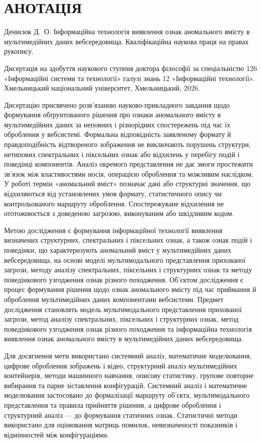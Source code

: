 \chapter*{АНОТАЦІЯ}
{}

Денисюк Д.~О. Інформаційна технологія виявлення ознак аномального вмісту в мультимедійних даних вебсередовища. Кваліфікаційна наукова праця на правах рукопису.

Дисертація на здобуття наукового ступеня доктора філософії за спеціальністю 126 «Інформаційні системи та технології» галузі знань 12 «Інформаційні технології». Хмельницький національний університет, Хмельницький, 2026.

Дисертацію присвячено розв’язанню науково-прикладного завдання щодо формування обґрунтованого рішення про ознаки аномального вмісту в мультимедійних даних за неповних і різнорідних спостережень під час їх оброблення у вебсистемі. Формальна відповідність заявленому формату й правдоподібність відтвореного зображення не виключають порушень структури, нетипових спектральних і піксельних ознак або відхилень у перебігу подій і поведінці компонентів. Аналіз окремого представлення не дає змоги простежити зв’язок між властивостями носія, операцією оброблення та можливим наслідком. У роботі термін «аномальний вміст» позначає дані або структурні значення, що відхиляються від установлених умов формату, статистичного опису чи контрольованого маршруту оброблення. Спостережуване відхилення не ототожнюється з доведеною загрозою, виконуваним або шкідливим кодом.

Метою дослідження є формування інформаційної технології виявлення визначених структурних, спектральних і піксельних ознак, а також ознак подій і поведінки, що характеризують аномальний вміст у мультимедійних даних вебсередовища, на основі моделі мультимодального представлення прихованої загрози, методу аналізу спектральних, піксельних і структурних ознак та методу поведінкового узгодження ознак різного походження. Об’єктом дослідження є процес формування рішення щодо ознак аномального вмісту під час приймання й оброблення мультимедійних даних компонентами вебсистеми. Предмет дослідження становлять модель мультимодального представлення прихованої загрози, метод аналізу спектральних, піксельних і структурних ознак, метод поведінкового узгодження ознак різного походження та інформаційна технологія виявлення ознак аномального вмісту в мультимедійних даних вебсередовища.

Для досягнення мети використано системний аналіз, математичне моделювання, цифрове оброблення зображень і відео, структурний аналіз мультимедійних контейнерів, методи машинного навчання, описову статистику, групове повторне вибирання та парне зіставлення конфігурацій. Системний аналіз і математичне моделювання застосовано до формалізації маршруту об’єкта, мультимодального представлення та правила прийняття рішення, а цифрове оброблення і структурний аналіз --- до формування статичних ознак. Статистичні методи використано для оцінювання матриць помилок, невизначеності показників і відмінностей між конфігураціями.

